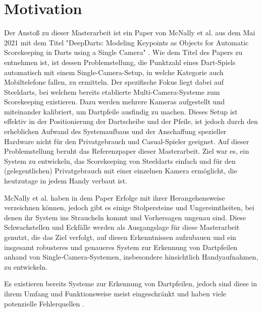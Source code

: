 \section{Motivation}
\label{sec:motivation}

Der Anstoß zu dieser Masterarbeit ist ein Paper von McNally et al. aus dem Mai 2021 mit dem Titel "DeepDarts: Modeling Keypoints as Objects for Automatic Scorekeeping in Darts using a Single Camera" \cite{deepdarts}. Wie dem Titel des Papers zu entnehmen ist, ist dessen Problemstellung, die Punktzahl eines Dart-Spiels automatisch mit einem Single-Camera-Setup, in welche Kategorie auch Mobiltelefone fallen, zu ermitteln. Der spezifische Fokus liegt dabei auf Steeldarts, bei welchem bereits etablierte Multi-Camera-Systeme zum Scorekeeping existieren. Dazu werden mehrere Kameras aufgestellt und miteinander kalibriert, um Dartpfeile ausfindig zu machen. Dieses Setup ist effektiv in der Positionierung der Dartscheibe und der Pfeile, ist jedoch durch den erheblichen Aufwand des Systemaufbaus und der Anschaffung spezieller Hardware nicht für den Privatgebrauch und Casual-Spieler geeignet. Auf dieser Problemstellung beruht das Referenzpaper dieser Masterarbeit. Ziel war es, ein System zu entwickeln, das Scorekeeping von Steeldarts einfach und für den (gelegentlichen) Privatgebrauch mit einer einzelnen Kamera ermöglicht, die heutzutage in jedem Handy verbaut ist.

McNally et al. haben in dem Paper Erfolge mit ihrer Herangehensweise verzeichnen können, jedoch gibt es einige Stolpersteine und Ungereimtheiten, bei denen ihr System ins Straucheln kommt und Vorhersagen ungenau sind. Diese Schwachstellen und Eckfälle werden als Ausgangslage für diese Masterarbeit genutzt, die das Ziel verfolgt, auf diesen Erkenntnissen aufzubauen und ein insgesamt robusteres und genaueres System zur Erkennung von Dartpfeilen anhand von Single-Camera-Systemen, insbesondere hinsichtlich Handyaufnahmen, zu entwickeln.

Es existieren bereits Systeme zur Erkennung von Dartpfeilen, jedoch sind diese in ihrem Umfang und Funktionsweise meist eingeschränkt und haben viele potenzielle Fehlerquellen \cite{dartscore-repo}.

\iffalse

